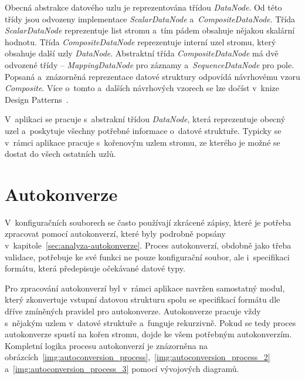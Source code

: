 \documentclass[FM,bw,DP]{tulthesis}
\begin{document}
Obecná abstrakce datového uzlu je reprezentována třídou \textit{DataNode}. Od této třídy jsou odvozeny implementace \textit{ScalarDataNode} a~\textit{CompositeDataNode}. Třída \textit{ScalarDataNode} reprezentuje list stromu a~tím pádem obsahuje nějakou skalární hodnotu. Třída \textit{CompositeDataNode} reprezentuje interní uzel stromu, který obsahuje další uzly \textit{DataNode}. Abstraktní třída \textit{CompositeDataNode} má dvě odvozené třídy -- \textit{MappingDataNode} pro záznamy a~\textit{SequenceDataNode} pro pole. Popsaná a~znázorněná reprezentace datové struktury odpovídá návrhovému vzoru \textit{Composite}. Více o~tomto a~dalších návrhových vzorech se lze dočíst v~knize Design Patterns~\cite{bib:design-patterns}.

V~aplikaci se pracuje s~abstrakní třídou \textit{DataNode}, která reprezentuje obecný uzel a~poskytuje všechny potřebné informace o~datové struktuře. Typicky se v~rámci aplikace pracuje s~kořenovým uzlem stromu, ze kterého je možné se dostat do všech ostatních uzlů.

\section{Autokonverze}

V~konfiguračních souborech se často používají zkrácené zápisy, které je potřeba zpracovat pomocí autokonverzí, které byly podrobně popsány v~kapitole~\ref{sec:analyza-autokonverze}. Proces autokonverzí, obdobně jako třeba validace, potřebuje ke své funkci ne pouze konfigurační soubor, ale i~specifikaci formátu, která předepisuje očekávané datové typy.

Pro zpracování autokonverzí byl v~rámci aplikace navržen samostatný modul, který zkonvertuje vstupní datovou strukturu spolu se specifikací formátu dle dříve zmíněných pravidel pro autokonverze. Autokonverze pracuje vždy s~nějakým uzlem v~datové struktuře a~funguje rekurzivně. Pokud se tedy proces autokonverze spustí na kořen stromu, dojde ke všem potřebným autokonverzím. Kompletní logika procesu autokonverzí je znázorněna na obrázcích~\ref{img:autoconversion_process},~\ref{img:autoconversion_process_2}  a~\ref{img:autoconversion_process_3} pomocí vývojových diagramů. 
\end{document}
